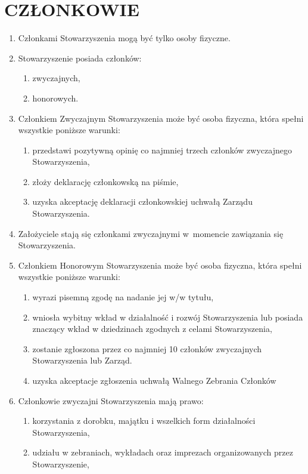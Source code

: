 \documentclass{article}
\begin{document}
\section{CZŁONKOWIE}
  \begin{enumerate}
    \item Członkami Stowarzyszenia mogą być tylko osoby fizyczne.
    \item Stowarzyszenie posiada członków:
      \begin{enumerate}
        \item zwyczajnych,
        \item honorowych.
      \end{enumerate}
    \item Członkiem Zwyczajnym Stowarzyszenia może być osoba fizyczna, która spełni wszystkie poniższe warunki:
      \begin{enumerate}
         \item przedstawi pozytywną opinię co najmniej trzech członków zwyczajnego Stowarzyszenia,
        \item złoży deklarację członkowską na piśmie,
        \item uzyska akceptację deklaracji członkowskiej uchwałą Zarządu Stowarzyszenia.
      \end{enumerate}
    \item Założyciele stają się członkami zwyczajnymi w~momencie zawiązania się Stowarzyszenia.
    \item Członkiem Honorowym Stowarzyszenia może być osoba fizyczna, która spełni wszystkie poniższe warunki:
      \begin{enumerate}
        \item wyrazi pisemną zgodę na nadanie jej w/w tytułu,
        \item wniosła wybitny wkład w działalność i rozwój Stowarzyszenia lub posiada znaczący wkład w dziedzinach zgodnych z celami Stowarzyszenia,
        \item zostanie zgłoszona przez co najmniej 10 członków zwyczajnych Stowarzyszenia lub Zarząd.
        \item uzyska akceptacje zgłoszenia uchwałą Walnego Zebrania Członków
      \end{enumerate}
    \item Członkowie zwyczajni Stowarzyszenia mają prawo:
      \begin{enumerate}
        \item korzystania z dorobku, majątku i wszelkich form działalności Stowarzyszenia,
        \item udziału w zebraniach, wykładach oraz imprezach organizowanych przez Stowarzyszenie,

\end{enumerate}
\end{enumerate}
\end{document}
